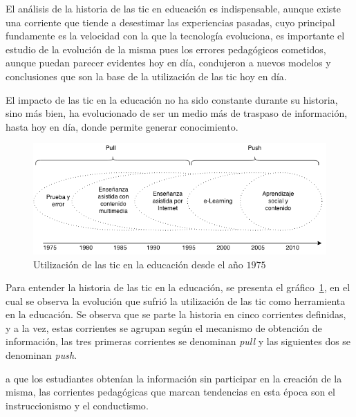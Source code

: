 El análisis de la historia de las \Gls{tic} en educación es indispensable,
aunque existe una corriente que tiende a desestimar las experiencias pasadas,
cuyo principal fundamente es la velocidad con la que la tecnología evoluciona,
es importante el estudio de la evolución de la misma pues los errores
pedagógicos cometidos, aunque puedan parecer evidentes hoy en día, condujeron a
nuevos modelos y conclusiones que son la base de la utilización de las
\Gls{tic} hoy en día\cite{mcdougall2006theory}.


El impacto de las \Gls{tic} en la educación no ha sido constante durante su
historia, sino más bien, ha evolucionado de ser un medio más de traspaso de
información, hasta hoy en día, donde permite generar
conocimiento\cite{tinio:ict}.

\begin{figure}
\centering
\includegraphics[scale=0.75]{tics/images/tics_history.png}
\caption{Utilización de las \Gls{tic} en la educación desde el año $1975$}
\label{fig:history_tics}
\end{figure}

Para entender la historia de las \Gls{tic} en la educación, se presenta el
gráfico~\ref{fig:history_tics}, en el cual se observa la evolución que sufrió la
utilización de las \Gls{tic} como herramienta en la educación. Se observa que se
parte la historia en cinco corrientes definidas, y a la vez, estas corrientes se
agrupan según el mecanismo de obtención de información, las tres primeras
corrientes se denominan \textit{pull} y las siguientes dos se denominan
\textit{push}. 

 a que los estudiantes
obtenían la información sin participar en la creación de la misma, las
corrientes pedagógicas que marcan tendencias en esta época son el
instruccionismo y el conductismo\cite{white:ict}.

